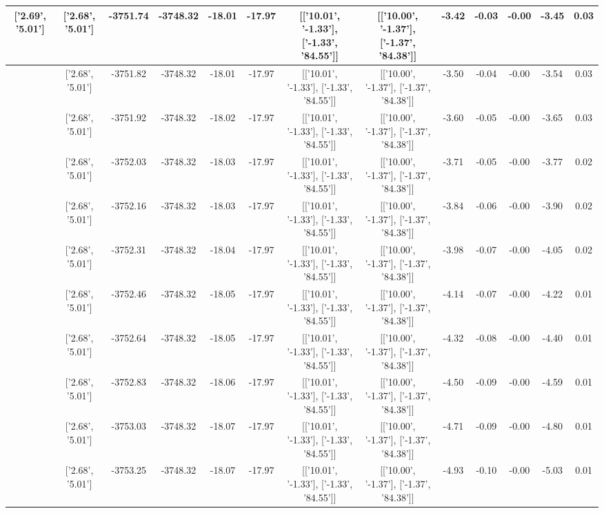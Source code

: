\begin{table}[htbp]
\begin{adjustbox}{angle=90}
\begin{tabular}{|c|c|c|c|c|c|c|c|c|c|c|c|c|}
 ['2.69', '5.01'] & ['2.68', '5.01'] & -3751.74 & -3748.32 & -18.01 & -17.97 & [['10.01', '-1.33'], ['-1.33', '84.55']] & [['10.00', '-1.37'], ['-1.37', '84.38']] & -3.42 & -0.03 & -0.00 & -3.45 & 0.03\\ \hline
 ['2.69', '5.01'] & ['2.68', '5.01'] & -3751.82 & -3748.32 & -18.01 & -17.97 & [['10.01', '-1.33'], ['-1.33', '84.55']] & [['10.00', '-1.37'], ['-1.37', '84.38']] & -3.50 & -0.04 & -0.00 & -3.54 & 0.03\\ \hline
 ['2.69', '5.01'] & ['2.68', '5.01'] & -3751.92 & -3748.32 & -18.02 & -17.97 & [['10.01', '-1.33'], ['-1.33', '84.55']] & [['10.00', '-1.37'], ['-1.37', '84.38']] & -3.60 & -0.05 & -0.00 & -3.65 & 0.03\\ \hline
 ['2.69', '5.01'] & ['2.68', '5.01'] & -3752.03 & -3748.32 & -18.03 & -17.97 & [['10.01', '-1.33'], ['-1.33', '84.55']] & [['10.00', '-1.37'], ['-1.37', '84.38']] & -3.71 & -0.05 & -0.00 & -3.77 & 0.02\\ \hline
 ['2.70', '5.01'] & ['2.68', '5.01'] & -3752.16 & -3748.32 & -18.03 & -17.97 & [['10.01', '-1.33'], ['-1.33', '84.55']] & [['10.00', '-1.37'], ['-1.37', '84.38']] & -3.84 & -0.06 & -0.00 & -3.90 & 0.02\\ \hline
 ['2.70', '5.01'] & ['2.68', '5.01'] & -3752.31 & -3748.32 & -18.04 & -17.97 & [['10.01', '-1.33'], ['-1.33', '84.55']] & [['10.00', '-1.37'], ['-1.37', '84.38']] & -3.98 & -0.07 & -0.00 & -4.05 & 0.02\\ \hline
 ['2.70', '5.01'] & ['2.68', '5.01'] & -3752.46 & -3748.32 & -18.05 & -17.97 & [['10.01', '-1.33'], ['-1.33', '84.55']] & [['10.00', '-1.37'], ['-1.37', '84.38']] & -4.14 & -0.07 & -0.00 & -4.22 & 0.01\\ \hline
 ['2.70', '5.01'] & ['2.68', '5.01'] & -3752.64 & -3748.32 & -18.05 & -17.97 & [['10.01', '-1.33'], ['-1.33', '84.55']] & [['10.00', '-1.37'], ['-1.37', '84.38']] & -4.32 & -0.08 & -0.00 & -4.40 & 0.01\\ \hline
 ['2.70', '5.01'] & ['2.68', '5.01'] & -3752.83 & -3748.32 & -18.06 & -17.97 & [['10.01', '-1.33'], ['-1.33', '84.55']] & [['10.00', '-1.37'], ['-1.37', '84.38']] & -4.50 & -0.09 & -0.00 & -4.59 & 0.01\\ \hline
 ['2.70', '5.02'] & ['2.68', '5.01'] & -3753.03 & -3748.32 & -18.07 & -17.97 & [['10.01', '-1.33'], ['-1.33', '84.55']] & [['10.00', '-1.37'], ['-1.37', '84.38']] & -4.71 & -0.09 & -0.00 & -4.80 & 0.01\\ \hline
 ['2.70', '5.02'] & ['2.68', '5.01'] & -3753.25 & -3748.32 & -18.07 & -17.97 & [['10.01', '-1.33'], ['-1.33', '84.55']] & [['10.00', '-1.37'], ['-1.37', '84.38']] & -4.93 & -0.10 & -0.00 & -5.03 & 0.01\\ \hline

\end{tabular}
\end{adjustbox}
\end{table}
